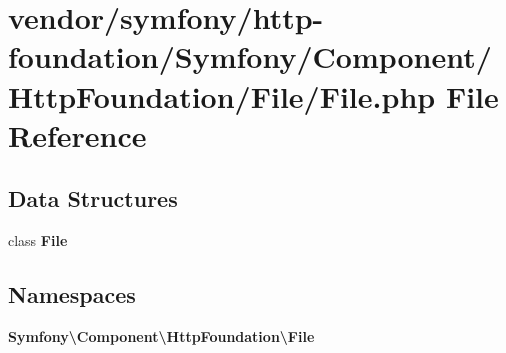 \section{vendor/symfony/http-\/foundation/\+Symfony/\+Component/\+Http\+Foundation/\+File/\+File.php File Reference}
\label{symfony_2http-foundation_2_symfony_2_component_2_http_foundation_2_file_2_file_8php}
\subsection*{Data Structures}
\begin{DoxyCompactItemize}
\item 
class {\bf File}
\end{DoxyCompactItemize}
\subsection*{Namespaces}
\begin{DoxyCompactItemize}
\item 
 {\bf Symfony\textbackslash{}\+Component\textbackslash{}\+Http\+Foundation\textbackslash{}\+File}
\end{DoxyCompactItemize}
